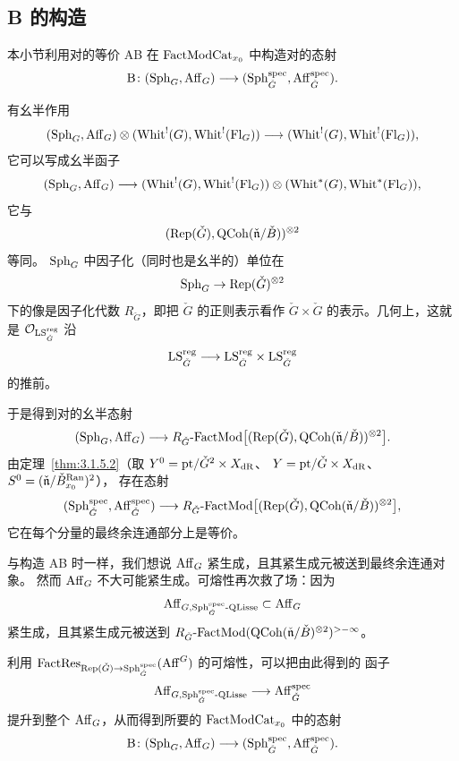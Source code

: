 
\subsection{B 的构造}
\label{sec:b-construction}

本小节利用对的等价 AB 在 $\mathrm{FactModCat}_{x_0}$ 中构造对的态射
\[
\mathrm{B}\colon
(\mathrm{Sph}_G,\mathrm{Aff}_G)\longrightarrow
(\mathrm{Sph}^{\mathrm{spec}}_{\check G},\mathrm{Aff}^{\mathrm{spec}}_{\check G}).
\]

有幺半作用
\[
(\mathrm{Sph}_G,\mathrm{Aff}_G)\otimes (\mathrm{Whit}^{!}(G),\mathrm{Whit}^{!}(\mathrm{Fl}_G))\longrightarrow
(\mathrm{Whit}^{!}(G),\mathrm{Whit}^{!}(\mathrm{Fl}_G)),
\]
它可以写成幺半函子
\[
(\mathrm{Sph}_G,\mathrm{Aff}_G)\longrightarrow
(\mathrm{Whit}^{!}(G),\mathrm{Whit}^{!}(\mathrm{Fl}_G))\otimes
(\mathrm{Whit}^{*}(G),\mathrm{Whit}^{*}(\mathrm{Fl}_G)),
\]
它与
\[
(\mathrm{Rep}(\check G),\mathrm{QCoh}(\check{\mathfrak{n}}/\check B))^{\otimes 2}
\]
等同。
$\mathrm{Sph}_G$ 中因子化（同时也是幺半的）单位在
\[
\mathrm{Sph}_G\to \mathrm{Rep}(\check G)^{\otimes 2}
\]
下的像是因子化代数 $R_{\check G}$，即把 $\check G$ 的正则表示看作 $\check G\times\check G$
的表示。几何上，这就是 $\mathcal{O}_{\mathrm{LS}^{\mathrm{reg}}_{\check G}}$ 沿
\[
\mathrm{LS}^{\mathrm{reg}}_{\check G}\longrightarrow
\mathrm{LS}^{\mathrm{reg}}_{\check G}\times \mathrm{LS}^{\mathrm{reg}}_{\check G}
\]
的推前。

于是得到对的幺半态射
\[
(\mathrm{Sph}_G,\mathrm{Aff}_G)\longrightarrow
R_{\check G}\text{-}\mathrm{FactMod}
\bigl[(\mathrm{Rep}(\check G),\mathrm{QCoh}(\check{\mathfrak{n}}/\check B))^{\otimes 2}\bigr].
\]
由定理~\ref{thm:3.1.5.2}（取 $Y^0=\mathrm{pt}/\check G^2\times X_{\mathrm{dR}}$、
$Y=\mathrm{pt}/\check G\times X_{\mathrm{dR}}$、$S^0=(\check{\mathfrak{n}}/\check B^{\mathrm{Ran}}_{x_0})^2$），
存在态射
\[
(\mathrm{Sph}^{\mathrm{spec}}_{\check G},\mathrm{Aff}^{\mathrm{spec}}_{\check G})\longrightarrow
R_{\check G}\text{-}\mathrm{FactMod}
\bigl[(\mathrm{Rep}(\check G),\mathrm{QCoh}(\check{\mathfrak{n}}/\check B))^{\otimes 2}\bigr],
\]
它在每个分量的最终余连通部分上是等价。

与构造 AB 时一样，我们想说 $\mathrm{Aff}_G$ 紧生成，且其紧生成元被送到最终余连通对象。
然而 $\mathrm{Aff}_G$ 不大可能紧生成。可熔性再次救了场：因为
\[
\mathrm{Aff}_{G,\mathrm{Sph}^{\mathrm{spec}}_{\check G}\text{-}\mathrm{QLisse}}\subset \mathrm{Aff}_G
\]
紧生成，且其紧生成元被送到
$R_{\check G}\text{-}\mathrm{FactMod}(\mathrm{QCoh}(\check{\mathfrak{n}}/\check B)^{\otimes 2})^{>-\infty}$。

利用 $\mathrm{FactRes}_{\mathrm{Rep}(\check G)\to \mathrm{Sph}^{\mathrm{spec}}_{\check G}}(\mathrm{Aff}^G)$ 的可熔性，可以把由此得到的
函子
\[
\mathrm{Aff}_{G,\mathrm{Sph}^{\mathrm{spec}}_{\check G}\text{-}\mathrm{QLisse}}\longrightarrow \mathrm{Aff}^{\mathrm{spec}}_{\check G}
\]
提升到整个 $\mathrm{Aff}_G$，从而得到所要的 $\mathrm{FactModCat}_{x_0}$ 中的态射
\[
\mathrm{B}\colon
(\mathrm{Sph}_G,\mathrm{Aff}_G)\longrightarrow
(\mathrm{Sph}^{\mathrm{spec}}_{\check G},\mathrm{Aff}^{\mathrm{spec}}_{\check G}).
\]

